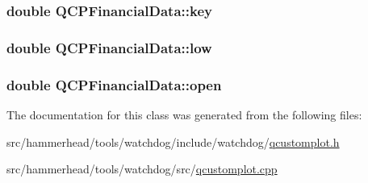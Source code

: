 \subsubsection[{\texorpdfstring{key}{key}}]{\setlength{\rightskip}{0pt plus 5cm}double Q\+C\+P\+Financial\+Data\+::key}\hypertarget{classQCPFinancialData_a18bc92126f28c214b05b0161e5f5958b}{}\label{classQCPFinancialData_a18bc92126f28c214b05b0161e5f5958b}
\subsubsection[{\texorpdfstring{low}{low}}]{\setlength{\rightskip}{0pt plus 5cm}double Q\+C\+P\+Financial\+Data\+::low}\hypertarget{classQCPFinancialData_aecce0fb45a115e3f3a25eea78491ac16}{}\label{classQCPFinancialData_aecce0fb45a115e3f3a25eea78491ac16}
\subsubsection[{\texorpdfstring{open}{open}}]{\setlength{\rightskip}{0pt plus 5cm}double Q\+C\+P\+Financial\+Data\+::open}\hypertarget{classQCPFinancialData_a3059e1e1fbcb9fd243fde0450f238032}{}\label{classQCPFinancialData_a3059e1e1fbcb9fd243fde0450f238032}


The documentation for this class was generated from the following files\+:\begin{DoxyCompactItemize}
\item 
src/hammerhead/tools/watchdog/include/watchdog/\hyperlink{qcustomplot_8h}{qcustomplot.\+h}\item 
src/hammerhead/tools/watchdog/src/\hyperlink{qcustomplot_8cpp}{qcustomplot.\+cpp}\end{DoxyCompactItemize}
